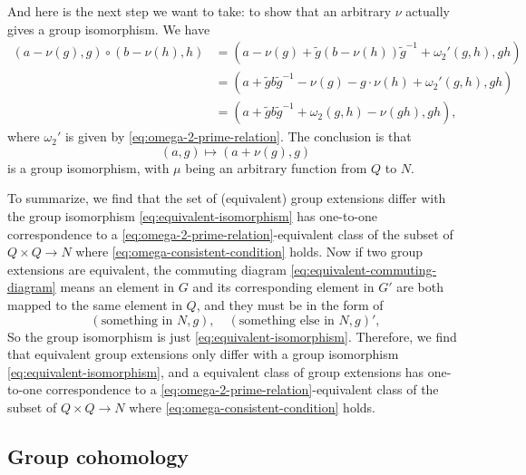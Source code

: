\documentclass[hyperref, a4paper]{article}
\begin{document}
And here is the next step we want to take: to show that an arbitrary $\nu$ actually gives a group isomorphism.
We have 
\[
    \begin{aligned}
        (a - \nu(g), g) \circ (b - \nu(h), h) &= (a - \nu(g) + \tilde{g} (b - \nu(h)) \tilde{g}^{-1} + \omega_2'(g, h), gh) \\
        &= (a + \tilde{g} b \tilde{g}^{-1} - \nu(g) - g \cdot \nu(h) + \omega_2'(g, h) , gh) \\
        &= (a + \tilde{g} b \tilde{g}^{-1} + \omega_2(g,h) - \nu(gh), gh),
    \end{aligned}
\]
where $\omega_2'$ is given by \eqref{eq:omega-2-prime-relation}.  
The conclusion is that 
\begin{equation}
    (a, g) \mapsto (a + \nu(g), g )
    \label{eq:equivalent-isomorphism}
\end{equation}
is a group isomorphism, with $\mu$ being an arbitrary function from $Q$ to $N$. 

To summarize, we find that the set of (equivalent) group extensions differ with the group isomorphism 
\eqref{eq:equivalent-isomorphism} has one-to-one correspondence to a \eqref{eq:omega-2-prime-relation}-equivalent
class of the subset of $Q \times Q \to N$ where \eqref{eq:omega-consistent-condition} holds. Now if two 
group extensions are equivalent, the commuting diagram \eqref{eq:equivalent-commuting-diagram} means 
an element in $G$ and its corresponding element in $G'$ are both mapped to the same element in $Q$,
and they must be in the form of 
\[
    (\text{something in $N$}, g), \quad (\text{something else in $N$}, g)',
\] 
So the group isomorphism is just \eqref{eq:equivalent-isomorphism}. Therefore, we find that equivalent 
group extensions only differ with a group isomorphism \eqref{eq:equivalent-isomorphism}, and a equivalent 
class of group extensions has one-to-one correspondence to a \eqref{eq:omega-2-prime-relation}-equivalent
class of the subset of $Q \times Q \to N$ where \eqref{eq:omega-consistent-condition} holds.

\subsection{Group cohomology}
\end{document}
